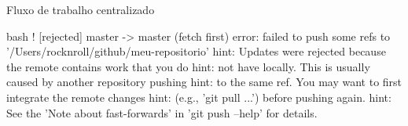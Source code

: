 \documentclass[aspectratio=169]{beamer} %
\begin{document}
\begin{SliTC}{Fluxo de trabalho centralizado}
\begin{itemize}


    \begin{itemize}
    
    
    \end{itemize}

\end{itemize}

\begin{CodeD}{bash}
 ! [rejected]        master -> master (fetch first)
error: failed to push some refs to '/Users/rocknroll/github/meu-repositorio'
hint: Updates were rejected because the remote contains work that you do
hint: not have locally. This is usually caused by another repository pushing
hint: to the same ref. You may want to first integrate the remote changes
hint: (e.g., 'git pull ...') before pushing again.
hint: See the 'Note about fast-forwards' in 'git push --help' for details.
\end{CodeD}

\end{SliTC}
\end{document}
